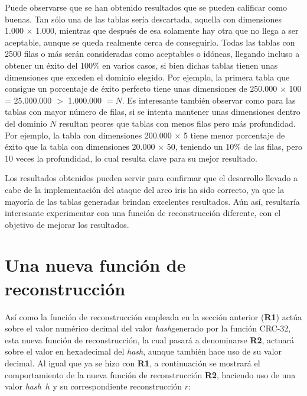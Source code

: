 \documentclass[12pt,spanish,listoffigures,listoftables,listofalgorithms]{tfgetsinf}
\newcommand{\hash}{\textit{hash}}
\begin{document}
Puede observarse que se han obtenido resultados que se pueden calificar como buenas. Tan sólo una de las tablas sería descartada, aquella con dimensiones 1.000 $\times$ 1.000, mientras que después de esa solamente hay otra que no llega a ser aceptable, aunque se queda realmente cerca de conseguirlo. Todas las tablas con 2500 filas o más serán consideradas como aceptables o idóneas, llegando incluso a obtener un éxito del 100\% en varios casos, si bien dichas tablas tienen unas dimensiones que exceden el dominio elegido. Por ejemplo, la primera tabla que consigue un porcentaje de éxito perfecto tiene unas dimensiones de 250.000 $\times$ 100 = 25.000.000 $>$ 1.000.000 $= N$. Es interesante también observar como para las tablas con mayor número de filas, si se intenta mantener unas dimensiones dentro del dominio $N$ resultan peores que tablas con menos filas pero más profundidad. Por ejemplo, la tabla con dimensiones 200.000 $\times$ 5 tiene menor porcentaje de éxito que la tabla con dimensiones 20.000 $\times$ 50, teniendo un 10\% de las filas, pero 10 veces la profundidad, lo cual resulta clave para su mejor resultado.

Los resultados obtenidos pueden servir para confirmar que el desarrollo llevado a cabe de la implementación del ataque del arco iris ha sido correcto, ya que la mayoría de las tablas generadas brindan excelentes resultados. Aún así, resultaría interesante experimentar con una función de reconstrucción diferente, con el objetivo de mejorar los resultados.

\section{Una nueva función de reconstrucción}

Así como la función de reconstrucción empleada en la sección anterior (\textbf{R1}) actúa sobre el valor numérico decimal del valor \hash generado por la función CRC-32, esta nueva función de reconstrucción, la cual pasará a denominarse \textbf{R2}, actuará sobre el valor en hexadecimal del \hash, aunque también hace uso de su valor decimal. Al igual que ya se hizo con \textbf{R1}, a continuación se mostrará el comportamiento de la nueva función de reconstrucción \textbf{R2}, haciendo uso de una valor \hash~$h$ y su correspondiente reconstrucción $r$:
\end{document}

